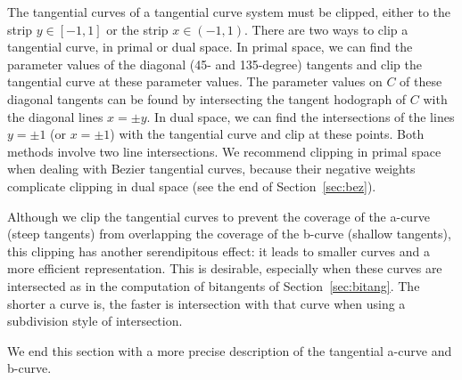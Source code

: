 \documentclass[12pt]{article}
\begin{document}
The tangential curves of a tangential curve system must be clipped,
either to the strip $y \in [-1,1]$ or the strip $x \in (-1,1)$.
There are two ways to clip a tangential curve, in primal or dual space.
In primal space, we can find the parameter values of the diagonal 
(45- and 135-degree) tangents and clip the tangential curve at these parameter values.
The parameter values on $C$ of these diagonal tangents can be found by intersecting
the tangent hodograph of $C$ with the diagonal lines $x = \pm y$.
In dual space, we can find the intersections of the lines $y=\pm 1$ (or $x=\pm 1$)
with the tangential curve and clip at these points.
Both methods involve two line intersections.
We recommend clipping in primal space when dealing with Bezier tangential curves,
because their negative weights complicate clipping in dual space
(see the end of Section~\ref{sec:bez}).

Although we clip the tangential curves to prevent the coverage of the a-curve
(steep tangents) from overlapping the coverage of the b-curve (shallow tangents),
this clipping has another serendipitous effect: it leads to smaller curves
and a more efficient representation.
This is desirable, especially when these curves are intersected
as in the computation of bitangents of Section~\ref{sec:bitang}.
The shorter a curve is, the faster is intersection with that curve
when using a subdivision style of intersection.


We end this section with a more precise description of the tangential a-curve
and b-curve.
\end{document}
